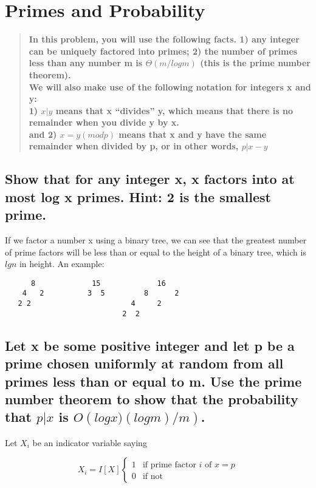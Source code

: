\documentclass[titlepage]{article}\usepackage[]{graphicx}\usepackage[]{color}
\begin{document}
\section{Primes and Probability}

\begin{quote}
	\textbf{
In this problem, you will use the following facts. 1) any integer can be
uniquely factored into primes; 2) the number of primes less than any number m
is $\Theta(m/ log m)$ (this is the prime number theorem). \\
We will also make use of the following notation for integers x and y: \\
1) $x|y$ means that x ``divides'' y, which means that there is no remainder
when you divide y by x. \\ 
and 2) $ x = y(modp)$ means that x and y have the same remainder when
divided by p, or in other words, $p|x−y$} 
\end{quote}

\subsection{Show that for any integer x, x factors into at most log x primes. Hint: 2 is
the smallest prime.}
If we factor a number x using a binary tree, we can see that the greatest
number of prime factors will be less than or equal to the height of a binary
tree, which is $lg n$ in height. An example:

\begin{verbatim}
      8             15             16
    4   2          3  5         8      2
   2 2                       4     2
                           2  2
\end{verbatim}

\subsection{ Let x be some positive integer and let p be a prime chosen uniformly at
random from all primes less than or equal to m. Use the prime number theorem to
show that the probability that $p|x$ is $O\left( log x)(log m)/m\right)$. }

Let $X_i$ be an indicator variable saying 

\[
	X_i = I[X]
  \begin{cases}
	1 & \text{if prime factor } i \text{ of } x = p \\
	0 & \text{if not } 
  \end{cases}
\]
\end{document}
